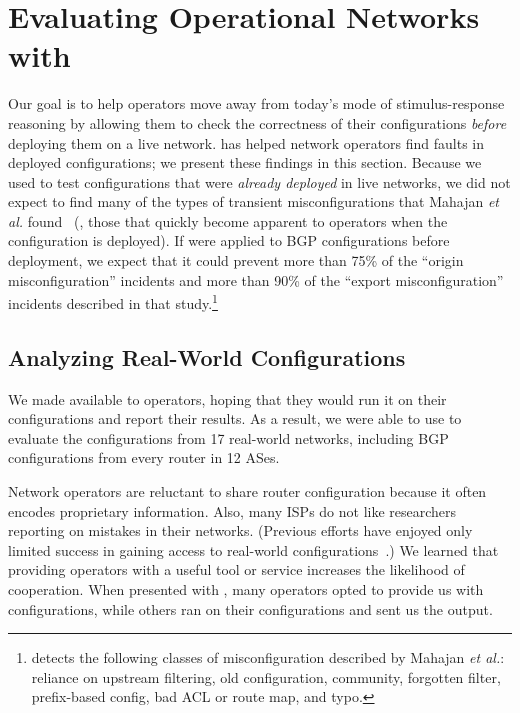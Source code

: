 \section{Evaluating Operational Networks with \rcc}\label{sec:evaluation}

Our goal is to help operators move away from today's mode of
stimulus-response reasoning by allowing them to check the correctness of
their configurations {\em before} deploying them on a live network.
\rcc has helped network operators find faults in deployed
configurations; we present these findings in this section.  Because we
used \rcc 
to test configurations that were {\em already deployed} in live
networks, we did not expect \rcc to find many of the types of transient
misconfigurations that Mahajan {\em et al.} found~\cite{Mahajan2002}
(\ie, those that quickly become apparent to operators when the
configuration is deployed).  If \rcc were applied to BGP configurations
before deployment, we expect that it could prevent more than 75\%
of the ``origin misconfiguration'' incidents and more than 90\% of the
``export misconfiguration'' incidents described in that
study.\footnote{\rcc detects the following classes of
  misconfiguration described by Mahajan {\em et al.}: reliance on
  upstream filtering, old configuration, community,
  forgotten filter, prefix-based config, bad ACL or route map, and typo.}

\subsection{Analyzing Real-World Configurations}

We made \rcc
available to operators, hoping that they would run it on their
configurations and report their results.
As a result, we were able to use \rcc to evaluate the configurations
from 17 real-world networks, 
including BGP configurations from every router in 12 ASes.  

Network operators are reluctant
to share router configuration because it often encodes
proprietary information.
Also, many ISPs do not like researchers reporting on mistakes in
their networks.  (Previous efforts have enjoyed only limited success
in gaining access to real-world
configurations~\cite{www-uw-configdonate}.)  
We learned that  providing operators with a useful tool or service
increases the likelihood of cooperation.
When presented
with \rccns, many operators opted to provide us with configurations,
while others ran \rcc on their configurations and sent us the 
output.

